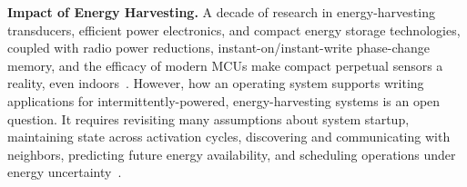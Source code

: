 \smallskip\noindent
\textbf{Impact of Energy Harvesting.}
%
%
A decade of research in energy-harvesting transducers, efficient power
electronics, and compact energy storage technologies, coupled
with radio power reductions,
instant-on/instant-write phase-change memory, and the efficacy of modern MCUs
make compact perpetual sensors a reality, even
indoors~\cite{doubledip}.
%
However, how an operating system supports writing applications for 
intermittently-powered, energy-harvesting systems is an open question. 
 It requires revisiting
many assumptions about system startup, maintaining state across
activation cycles, discovering and communicating with neighbors,
predicting future energy availability, and scheduling operations under
energy uncertainty~\cite{dewdrop}.
%


